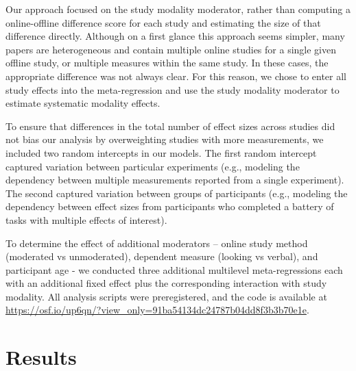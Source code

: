 \documentclass[
  man,floatsintext]{apa6}
\begin{document}
Our approach focused on the study modality moderator, rather than computing a online-offline difference score for each study and estimating the size of that difference directly. Although on a first glance this approach seems simpler, many papers are heterogeneous and contain multiple online studies for a single given offline study, or multiple measures within the same study. In these cases, the appropriate difference was not always clear. For this reason, we chose to enter all study effects into the meta-regression and use the study modality moderator to estimate systematic modality effects.

To ensure that differences in the total number of effect sizes across studies did not bias our analysis by overweighting studies with more measurements, we included two random intercepts in our models. The first random intercept captured variation between particular experiments (e.g., modeling the dependency between multiple measurements reported from a single experiment). The second captured variation between groups of participants (e.g., modeling the dependency between effect sizes from participants who completed a battery of tasks with multiple effects of interest).

To determine the effect of additional moderators -- online study method (moderated vs unmoderated), dependent measure (looking vs verbal), and participant age - we conducted three additional multilevel meta-regressions each with an additional fixed effect plus the corresponding interaction with study modality. All analysis scripts were preregistered, and the code is available at \url{https://osf.io/up6qn/?view_only=91ba54134dc24787b04dd8f3b3b70e1e}.

\hypertarget{results}{%
\section{Results}\label{results}}
\end{document}
